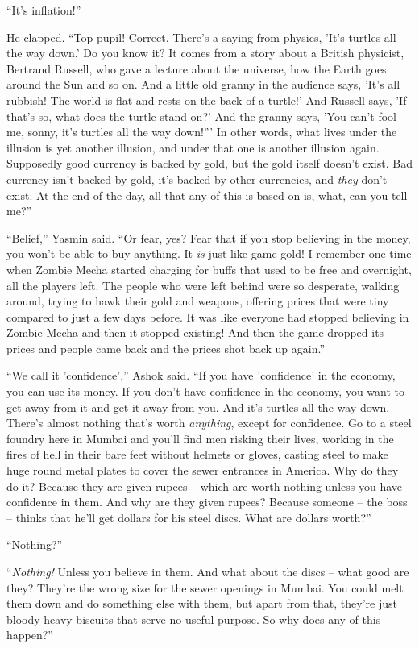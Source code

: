 ``It's inflation!''

He clapped. ``Top pupil! Correct. There's a saying from physics,
'It's turtles all the way down.' Do you know it? It comes from a
story about a British physicist, Bertrand Russell, who gave a
lecture about the universe, how the Earth goes around the Sun and
so on. And a little old granny in the audience says, 'It's all
rubbish! The world is flat and rests on the back of a turtle!' And
Russell says, 'If that's so, what does the turtle stand on?' And
the granny says, 'You can't fool me, sonny, it's turtles all the
way down!''' In other words, what lives under the illusion is yet
another illusion, and under that one is another illusion again.
Supposedly good currency is backed by gold, but the gold itself
doesn't exist. Bad currency isn't backed by gold, it's backed by
other currencies, and \emph{they} don't exist. At the end of the
day, all that any of this is based on is, what, can you tell me?''

``Belief,'' Yasmin said. ``Or fear, yes? Fear that if you stop
believing in the money, you won't be able to buy anything. It
\emph{is} just like game-gold! I remember one time when Zombie
Mecha started charging for buffs that used to be free and
overnight, all the players left. The people who were left behind
were so desperate, walking around, trying to hawk their gold and
weapons, offering prices that were tiny compared to just a few days
before. It was like everyone had stopped believing in Zombie Mecha
and then it stopped existing! And then the game dropped its prices
and people came back and the prices shot back up again.''

``We call it 'confidence','' Ashok said. ``If you have 'confidence' in
the economy, you can use its money. If you don't have confidence in
the economy, you want to get away from it and get it away from you.
And it's turtles all the way down. There's almost nothing that's
worth \emph{anything}, except for confidence. Go to a steel foundry
here in Mumbai and you'll find men risking their lives, working in
the fires of hell in their bare feet without helmets or gloves,
casting steel to make huge round metal plates to cover the sewer
entrances in America. Why do they do it? Because they are given
rupees -- which are worth nothing unless you have confidence in
them. And why are they given rupees? Because someone -- the boss --
thinks that he'll get dollars for his steel discs. What are dollars
worth?''

``Nothing?''

``\emph{Nothing!} Unless you believe in them. And what about the
discs -- what good are they? They're the wrong size for the sewer
openings in Mumbai. You could melt them down and do something else
with them, but apart from that, they're just bloody heavy biscuits
that serve no useful purpose. So why does any of this happen?''

